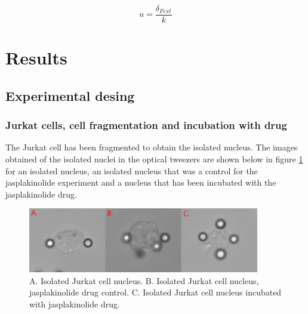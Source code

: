 \documentclass[12pt, a4paper]{article} %
\begin{document}
\begin{equation} \label{eqn:real_desp}
	u = \frac{\delta_{Fext}}{k}
\end{equation}

\newpage
\setlength{\parskip}{0mm}


\section{Results}

\subsection{Experimental desing}

\subsubsection{Jurkat cells, cell fragmentation and incubation with drug}

The Jurkat cell has been fragmented to obtain the isolated nucleus. The images obtained of the isolated nuclei in the optical tweezers are shown below in figure \ref{fig:jurkat_cells} for an isolated nucleus, an isolated nucleus that was a control for the jasplakinolide experiment and a nucleus that has been incubated with the jasplakinolide drug.

\setlength{\parskip}{4mm}

\begin{figure}[htbp]
	\centering
	\includegraphics[width=0.9\textwidth]{figures/jurkat_cell_shape.png}
	\caption{A. Isolated Jurkat cell nucleus. B. Isolated Jurkat cell nucleus, jasplakinolide drug control. C. Isolated Jurkat cell nucleus incubated with jasplakinolide drug.}
	\label{fig:jurkat_cells}
\end{figure}
\end{document}
